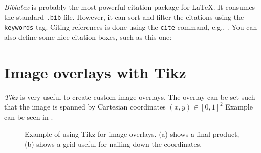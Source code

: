 \emph{Biblatex} is probably the most powerful citation package for LaTeX.
It consumes the standard \texttt{.bib} file. However, it can sort and filter the citations using the \texttt{keywords} tag.
Citing references is done using the \texttt{cite} command, e.g., \cite{baca2021mrs}.
You can also define some nice citation boxes, such as this one:

\section{Image overlays with Tikz}

\emph{Tikz} is very useful to create custom image overlays.
The overlay can be set such that the image is spanned by Cartesian coordinates $\left(x, y\right) \in \left[0, 1\right]^2$
Example can be seen in .

\begin{figure}[htbp]

  \centering

  

  \caption{Example of using Tikz for image overlays. (a) shows a final product, (b) shows a grid useful for nailing down the coordinates.}
  \label{fig:tikz_overlay}

\end{figure}
